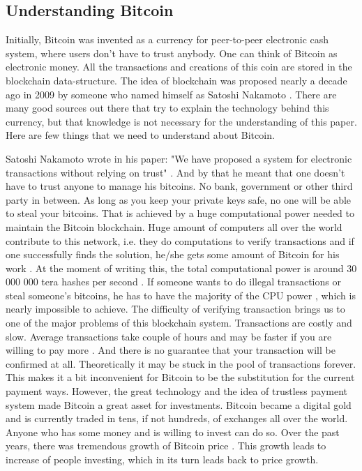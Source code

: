 \documentclass[a4paper,11pt,oneside]{article}
\begin{document}
  \subsection{Understanding Bitcoin}
  
  Initially, Bitcoin was invented as a currency for peer-to-peer electronic cash system, where users don't have to trust anybody. One can think of Bitcoin as electronic money.  All the transactions and creations of this coin are stored in the blockchain data-structure. The idea of blockchain was proposed nearly a decade ago in 2009 by someone who named himself as Satoshi Nakamoto \cite{BTC}. There are many good sources out there that try to explain the technology behind this currency, but that knowledge is not necessary for the understanding of this paper. Here are few things that we need to understand about Bitcoin. 
  
  Satoshi Nakamoto wrote in his paper: "We have proposed a system for electronic transactions without relying on trust" \cite{BTC}. And by that he meant that one doesn't have to trust anyone to manage his bitcoins. No bank, government or other third party in between. As long as you keep your private keys safe, no one will be able to steal your bitcoins. That is achieved by a huge computational power needed to maintain the Bitcoin blockchain. Huge amount of computers all over the world contribute to this network, i.e. they do computations to verify transactions and if one successfully finds the solution, he/she gets some amount of Bitcoin for his work \cite{BTC}. At the moment of writing this, the total computational power is around 30 000 000 tera hashes per second \cite{hashrate}. If someone wants to do illegal transactions or steal someone's bitcoins, he has to have the majority of the CPU power \cite{BTC}, which is nearly impossible to achieve. The difficulty of verifying transaction brings us to one of the major problems of this blockchain system. Transactions are costly and slow. Average transactions take couple of hours and may be faster if you are willing to pay more \cite{confirmationtime}. And there is no guarantee that your transaction will be confirmed at all. Theoretically it may be stuck in the pool of transactions forever. This makes it a bit inconvenient for Bitcoin to be the substitution for the current payment ways. However, the great technology and the idea of trustless payment system made Bitcoin a great asset for investments. Bitcoin became a digital gold and is currently traded in tens, if not hundreds, of exchanges all over the world. Anyone who has some money and is willing to invest can do so. Over the past years, there was tremendous growth of Bitcoin price \cite{pricechart}. This growth leads to increase of people investing, which in its turn leads back to price growth. 
  
\end{document}
